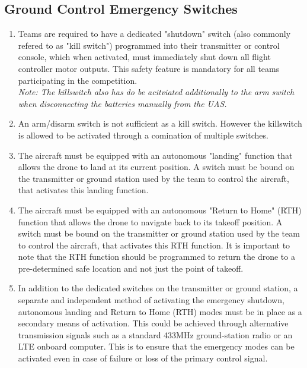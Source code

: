 \documentclass{article}
\begin{document}
\subsection{Ground Control Emergency Switches}
\begin{enumerate}
  \item Teams are required to have a dedicated "shutdown" switch (also commonly refered to as "kill switch") programmed into their transmitter or control console, which when activated, must immediately shut down all flight controller motor outputs. This safety feature is mandatory for all teams participating in the competition. \\ \emph{Note: The killswitch also has do be acitviated additionally to the arm switch when disconnecting the batteries manually from the UAS.}
  \item An arm/disarm switch is not sufficient as a kill switch. However the killswitch is allowed to be activated through a comination of multiple switches.
  \item The aircraft must be equipped with an autonomous "landing" function that allows the drone to land at its current position. A switch must be bound on the transmitter or ground station used by the team to control the aircraft, that activates this landing function.  
  \item The aircraft must be equipped with an autonomous "Return to Home" (RTH) function that allows the drone to navigate back to its takeoff position. A switch must be bound on the transmitter or ground station used by the team to control the aircraft, that activates this RTH function. It is important to note that the RTH function should be programmed to return the drone to a pre-determined safe location and not just the point of takeoff.
  \item In addition to the dedicated switches on the transmitter or ground station, a separate and independent method of activating the emergency shutdown, autonomous landing and Return to Home (RTH) modes must be in place as a secondary means of activation. This could be achieved through alternative transmission signals such as a standard 433MHz ground-station radio or an LTE onboard computer. This is to ensure that the emergency modes can be activated even in case of failure or loss of the primary control signal.
\end{enumerate}
\end{document}
